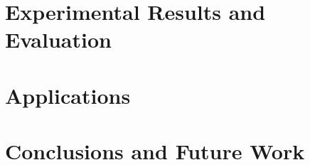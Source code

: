 \documentclass[annual]{acmsiggraph}
\begin{document}
\section{Experimental Results and Evaluation}\label{sec:exp}
\vspace{-2mm}


\vspace{-2mm}
\section{Applications} \label{sec:app}
\vspace{-2mm}


\section{Conclusions and Future Work}\label{sec:conclusions}
\vspace{-2mm}



%


\end{document}

